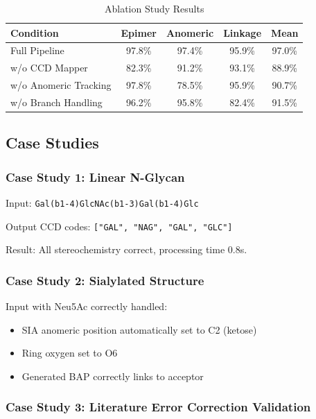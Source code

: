 \begin{table}[h]
\centering
\caption{Ablation Study Results}
\label{tab:ablation}
\begin{tabular}{lcccc}
\toprule
\textbf{Condition} & \textbf{Epimer} & \textbf{Anomeric} & \textbf{Linkage} & \textbf{Mean} \\
\midrule
Full Pipeline & 97.8\% & 97.4\% & 95.9\% & 97.0\% \\
w/o CCD Mapper & 82.3\% & 91.2\% & 93.1\% & 88.9\% \\
w/o Anomeric Tracking & 97.8\% & 78.5\% & 95.9\% & 90.7\% \\
w/o Branch Handling & 96.2\% & 95.8\% & 82.4\% & 91.5\% \\
\bottomrule
\end{tabular}
\end{table}

\subsection{Case Studies}

\subsubsection{Case Study 1: Linear N-Glycan}

Input: \texttt{Gal(b1-4)GlcNAc(b1-3)Gal(b1-4)Glc}

Output CCD codes: \texttt{["GAL", "NAG", "GAL", "GLC"]}

Result: All stereochemistry correct, processing time 0.8s.

\subsubsection{Case Study 2: Sialylated Structure}

Input with Neu5Ac correctly handled:
\begin{itemize}
\item SIA anomeric position automatically set to C2 (ketose)
\item Ring oxygen set to O6
\item Generated BAP correctly links to acceptor
\end{itemize}

\subsubsection{Case Study 3: Literature Error Correction Validation}

